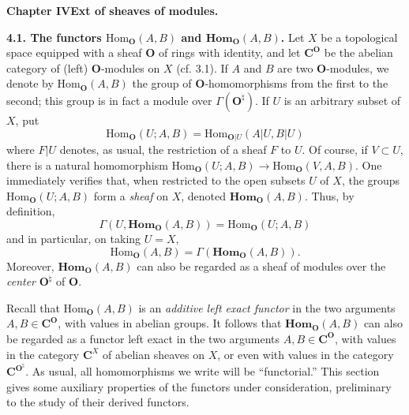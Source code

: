 \clearpage
{}

\begin{center}
{\large\bfseries Chapter IV\quad Ext of sheaves of modules.}
\end{center}

\textbf{4.1. The functors $\mathrm{Hom}_\mathbf O(A,B)$ and
$\mathbf{Hom}_\mathbf O(A,B)$.}
Let $X$ be a topological space equipped with a sheaf $\mathbf O$ of rings with
identity, and let $\mathbf C^\mathbf O$ be the abelian category of (left) $\mathbf O$-modules on $X$
(cf. 3.1). If $A$ and $B$ are two $\mathbf O$-modules, we denote by
$\mathrm{Hom}_\mathbf O(A,B)$ the group of $\mathbf O$-homomorphisms from the first to the
second; this group is in fact a module over $\Gamma(\mathbf O^\natural)$. If $U$
is an arbitrary subset of $X$, put
\[
\mathrm{Hom}_\mathbf O(U;A,B)=\mathrm{Hom}_{\mathbf O|U}(A|U,B|U)
\]
where $F|U$ denotes, as usual, the restriction of a sheaf $F$ to $U$.
Of course, if $V\subset U$, there is a natural homomorphism
$\mathrm{Hom}_\mathbf O(U;A,B)\to\mathrm{Hom}_\mathbf O(V,A,B)$. One immediately
verifies that, when restricted to the open subsets $U$ of $X$, the groups
$\mathrm{Hom}_\mathbf O(U;A,B)$ form a \textit{sheaf} on $X$, denoted
$\mathbf{Hom}_\mathbf O(A,B)$. Thus, by definition,
\[
\tag{4.1.1}
\Gamma(U,\mathbf{Hom}_\mathbf O(A,B))=\mathrm{Hom}_\mathbf O(U;A,B)
\]
and in particular, on taking $U=X$,
\[
\tag{4.1.2}
\mathrm{Hom}_\mathbf O(A,B)=\Gamma(\mathbf{Hom}_\mathbf O(A,B)).
\]
Moreover, $\mathbf{Hom}_\mathbf O(A,B)$ can also be regarded as a sheaf of modules
over the \textit{center} $\mathbf O^\natural$ of $\mathbf O$.

Recall that $\mathrm{Hom}_\mathbf O(A,B)$ is an \textit{additive left exact functor}
in the two arguments $A,B\in \mathbf C^\mathbf O$, with values in abelian groups. It follows
that $\mathbf{Hom}_\mathbf O(A,B)$ can also be regarded as a functor left exact in the
two arguments $A,B\in \mathbf C^\mathbf O$, with values in the category $\mathbf C^X$ of abelian
sheaves on $X$, or even with values in the category $\mathbf C^{\mathbf O^\natural}$. As
usual, all homomorphisms we write will be ``functorial.'' This section gives
some auxiliary properties of the functors under consideration, preliminary
to the study of their derived functors.

